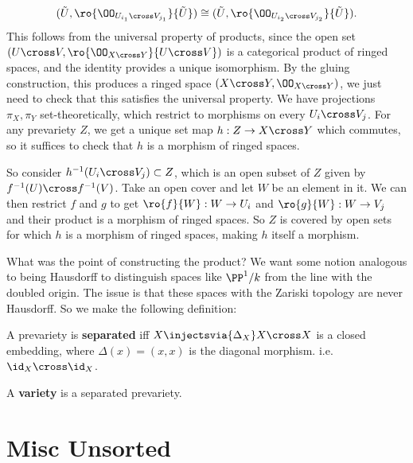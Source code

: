 \begin{align*}  
(\tilde U, \ro{ \OO_{U_{i_1} \cross V_{j_1}} }{\tilde U} ) \cong
(\tilde U, \ro{ \OO_{U_{i_2} \cross V_{j_2}} }{\tilde U} )
.\end{align*} This follows from the universal property of products,
since the open set \((U\cross V, \ro{ \OO_{X\cross Y} }{U\cross V} )\)
is a categorical product of ringed spaces, and the identity provides a
unique isomorphism. By the gluing construction, this produces a ringed
space \((X\cross Y, \OO_{X\cross Y})\), we just need to check that this
satisfies the universal property. We have projections \(\pi_X, \pi_Y\)
set-theoretically, which restrict to morphisms on every
\(U_i \cross V_j\). For any prevariety \(Z\), we get a unique set map
\(h:Z\to X\cross Y\) which commutes, so it suffices to check that \(h\)
is a morphism of ringed spaces.

So consider \(h^{-1} (U_i \cross V_j) \subset Z\), which is an open
subset of \(Z\) given by \(f^{-1}(U) \cross f^{-1}(V)\). Take an open
cover and let \(W\) be an element in it. We can then restrict \(f\) and
\(g\) to get \(\ro{f}{W}:W\to U_i\) and \(\ro{g}{W}:W\to V_j\) and their
product is a morphism of ringed spaces. So \(Z\) is covered by open sets
for which \(h\) is a morphism of ringed spaces, making \(h\) itself a
morphism.

What was the point of constructing the product? We want some notion
analogous to being Hausdorff to distinguish spaces like \(\PP^1/k\) from
the line with the doubled origin. The issue is that these spaces with
the Zariski topology are never Hausdorff. So we make the following
definition:

\begin{definition}[Separated]

A prevariety is \textbf{separated} iff
\(X \injectsvia{\Delta_X} X\cross X\) is a closed embedding, where
\(\Delta(x) = (x, x)\) is the diagonal morphism.
i.e.~\(\id_X \cross \id_X\).

\end{definition}

\begin{definition}[Variety]

A \textbf{variety} is a separated prevariety.

\end{definition}

\hypertarget{misc-unsorted}{%
\section{Misc Unsorted}\label{misc-unsorted}}

